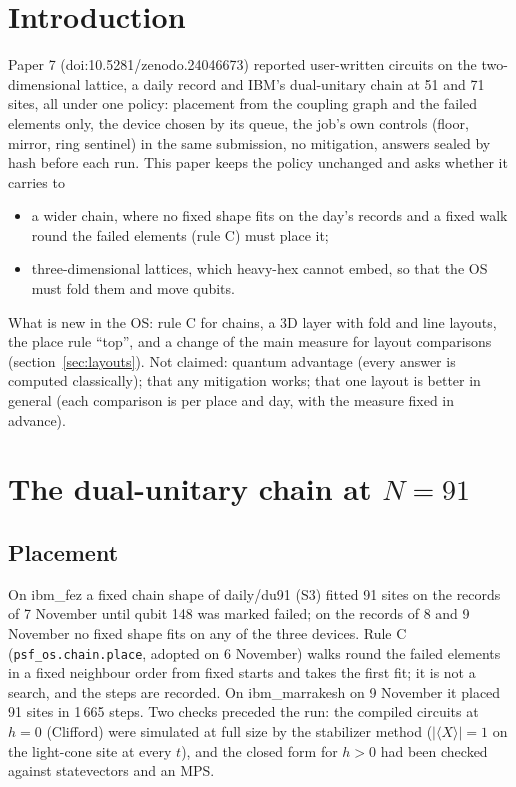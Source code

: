 \documentclass[10pt,a4paper]{article}
\begin{document}
\section{Introduction}\label{sec:intro}
Paper 7 (doi:10.5281/zenodo.24046673) reported user-written circuits on the two-dimensional lattice, a daily record
and IBM's dual-unitary chain at 51 and 71 sites, all under one policy: placement from the coupling graph and the
failed elements only, the device chosen by its queue, the job's own controls (floor, mirror, ring sentinel) in the
same submission, no mitigation, answers sealed by hash before each run. This paper keeps the policy unchanged and asks
whether it carries to
\begin{itemize}
\item a wider chain, where no fixed shape fits on the day's records and a fixed walk round the failed elements
(rule C) must place it;
\item three-dimensional lattices, which heavy-hex cannot embed, so that the OS must fold them and move qubits.
\end{itemize}
What is new in the OS: rule C for chains, a 3D layer with fold and line layouts, the place rule ``top'', and a
change of the main measure for layout comparisons (section~\ref{sec:layouts}). Not claimed: quantum advantage (every
answer is computed classically); that any mitigation works; that one layout is better in general (each comparison is
per place and day, with the measure fixed in advance).

\section{The dual-unitary chain at $N = 91$}\label{sec:du91}
\subsection{Placement}
On ibm\_fez a fixed chain shape of daily/du91 (S3) fitted 91 sites on the records of 7 November until qubit 148 was
marked failed; on the records of 8 and 9 November no fixed shape fits on any of the three devices.
Rule C (\texttt{psf\_os.chain.place}, adopted on 6 November) walks round the failed elements in a fixed neighbour order
from fixed starts and takes the first fit; it is not a search, and the steps are recorded. On ibm\_marrakesh on 9
November it placed 91 sites in 1\,665 steps. Two checks preceded the run: the compiled circuits at $h = 0$ (Clifford)
were simulated at full size by the stabilizer method ($|\langle X\rangle| = 1$ on the light-cone site at every $t$),
and the closed form for $h > 0$ had been checked against statevectors and an MPS.
\end{document}
